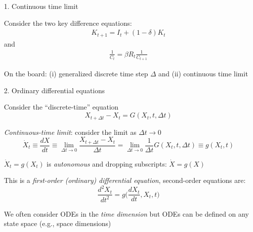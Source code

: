 \documentclass[11pt, aspectratio=169]{beamer}
\newenvironment{witemize}{\itemize\addtolength{\itemsep}{10pt}}{\enditemize}
\begin{document}
\begin{frame}{1. Continuous time limit}
\begin{witemize}
\item Consider the two key difference equations:
\begin{align*}
	K_{t+1} = I_t + (1-\delta) K_t 
\end{align*}
and
\begin{align*}
	\frac{1}{C_t} = \beta R_t \frac{1}{C_{t+1}}
\end{align*}

\item On the board: (i) generalized discrete time step $\Delta$ and (ii) continuous time limit

\end{witemize}
\end{frame}


\begin{frame}{2. Ordinary differential equations}
\begin{witemize}
\item Consider the ``discrete-time'' equation 
\begin{equation*}
	X_{t+\Delta t} - X_t = G(X_t, t, \Delta t)
\end{equation*}

\item \textit{Continuous-time limit}: consider the limit as $\Delta t \to 0$
\begin{equation*}
	\dot X_t \equiv \frac{dX}{dt} \equiv \lim_{\Delta t \to 0} \frac{X_{t+\Delta t} - X_t}{\Delta t} = \lim_{\Delta t \to 0} \frac{1}{\Delta t} G(X_t, t, \Delta t) \equiv g(X_t, t)
\end{equation*}

\item $\dot X_t = g(X_t)$ is \textit{autonomous} and dropping subscripts: $\dot X = g(X)$

\item This is a \textit{first-order (ordinary) differential equation}, second-order equations are:
\begin{equation*}
	\frac{d^2 X_t}{dt^2} = g \bigg( \frac{dX_t}{dt} , X_t, t \bigg)
\end{equation*}

\item We often consider ODEs in the \textit{time dimension} but ODEs can be defined on any state space (e.g., space dimensions)

\end{witemize}
\end{frame}
\end{document}
